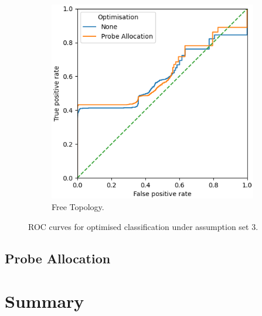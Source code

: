 \begin{figure}
\begin{subfigure}{0.475\textwidth}
        \includegraphics[width=\textwidth]{figs/results/france_ac3_opt.png}
        \caption{Free Topology.}
    \end{subfigure}
    \caption{ROC curves for optimised classification under assumption set 3.}
    \label{fig:RprobeoptA3ROCcurves}
\end{figure}

\subsection{Probe Allocation}
\label{ssec:Rprobeallocation}

\section{Summary}
